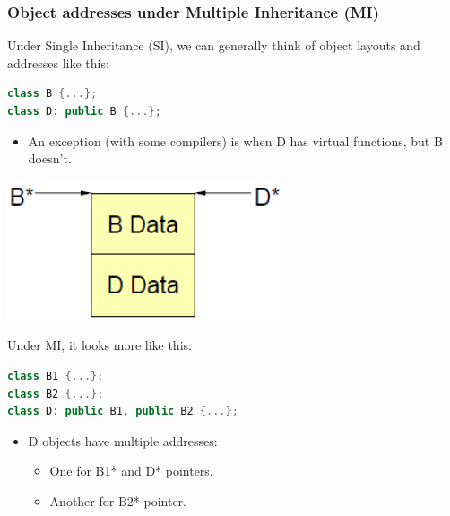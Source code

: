 \subsubsection{Object addresses under Multiple Inheritance (MI)}
\begin{minipage}{0.75\linewidth}
Under Single Inheritance (SI), we can generally think of object layouts and addresses like this:
\begin{lstlisting}[language=C++]
class B {...};
class D: public B {...};
\end{lstlisting}
\begin{itemize}
  \item An exception (with some compilers) is when D has virtual functions, but B doesn't.
\end{itemize}
\end{minipage}%
\hfill
\begin{minipage}{0.2\linewidth}
\begin{center}
  \includegraphics[width=\linewidth]{images/AdvancedCPP/SI}
\end{center}
\end{minipage}
\vspace{0.5\baselineskip}
\begin{minipage}{0.75\linewidth}
Under MI, it looks more like this:
\begin{lstlisting}[language=C++]
class B1 {...};
class B2 {...};
class D: public B1, public B2 {...};
\end{lstlisting}
\begin{itemize}
  \item D objects have multiple addresses:
  \begin{itemize}
    \item One for B1* and D* pointers.
    \item Another for B2* pointer.
  \end{itemize}
\end{itemize}
\end{minipage}
